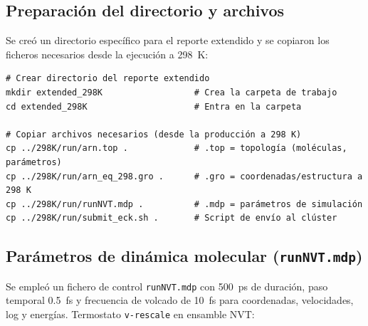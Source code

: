 \documentclass[12pt,a4paper]{article}
\begin{document}
\subsection{Preparación del directorio y archivos}
Se creó un directorio específico para el reporte extendido y se copiaron los ficheros necesarios desde la ejecución a \SI{298}{K}:

\begin{lstlisting}[style=bashstyle,texcl=false]
# Crear directorio del reporte extendido
mkdir extended_298K                  # Crea la carpeta de trabajo
cd extended_298K                     # Entra en la carpeta

# Copiar archivos necesarios (desde la producción a 298 K)
cp ../298K/run/arn.top .             # .top = topología (moléculas, parámetros)
cp ../298K/run/arn_eq_298.gro .      # .gro = coordenadas/estructura a 298 K
cp ../298K/run/runNVT.mdp .          # .mdp = parámetros de simulación
cp ../298K/run/submit_eck.sh .       # Script de envío al clúster
\end{lstlisting}

\subsection{Parámetros de dinámica molecular (\texttt{runNVT.mdp})}
Se empleó un fichero de control \texttt{runNVT.mdp} con \SI{500}{ps} de duración, paso temporal \SI{0.5}{fs} y frecuencia de volcado de \SI{10}{fs} para coordenadas, velocidades, log y energías. Termostato \texttt{v-rescale} en ensamble NVT:
\end{document}

